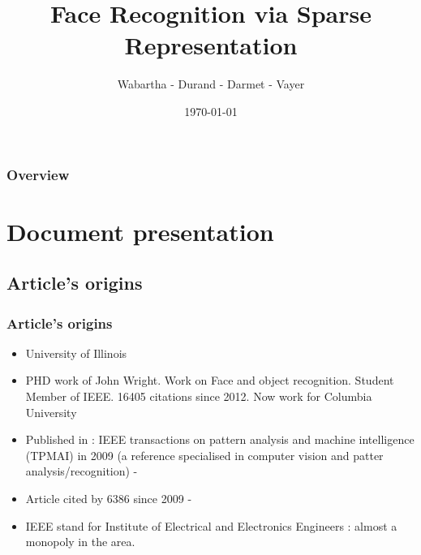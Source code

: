 \documentclass{beamer}
\title[Face Recognition via Sparse Representation]{Face Recognition via Sparse Representation} %
\author{ Wabartha -  Durand -  Darmet -  Vayer} %
\date{\today} %
\begin{document}
\begin{frame}
\titlepage %
\end{frame}

\begin{frame}
\frametitle{Overview} %
  \tableofcontents
\end{frame}




  
\section{Document presentation}


	\subsection{Article's origins}
	
	\begin{frame}
		\frametitle{Article's origins}

\begin{itemize}		
\item University of Illinois
\item PHD work of John Wright. Work on Face and object recognition. Student Member of IEEE. 16405 citations since 2012. Now work for Columbia University
\item Published in : IEEE transactions on pattern analysis and machine intelligence (TPMAI) in 2009 (a reference specialised in computer vision and patter analysis/recognition)
-\item Article cited by 6386 since 2009
-\item IEEE stand for Institute of Electrical and Electronics Engineers : almost a monopoly in the area. 
\end{itemize}


	
			\end{frame}
\end{document}
